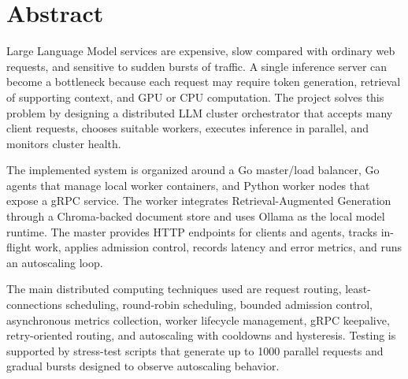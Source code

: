 \section*{Abstract}

Large Language Model services are expensive, slow compared with ordinary web requests, and sensitive to sudden bursts of traffic. A single inference server can become a bottleneck because each request may require token generation, retrieval of supporting context, and GPU or CPU computation. The project solves this problem by designing a distributed LLM cluster orchestrator that accepts many client requests, chooses suitable workers, executes inference in parallel, and monitors cluster health.

The implemented system is organized around a Go master/load balancer, Go agents that manage local worker containers, and Python worker nodes that expose a gRPC service. The worker integrates Retrieval-Augmented Generation through a Chroma-backed document store and uses Ollama as the local model runtime. The master provides HTTP endpoints for clients and agents, tracks in-flight work, applies admission control, records latency and error metrics, and runs an autoscaling loop.

The main distributed computing techniques used are request routing, least-connections scheduling, round-robin scheduling, bounded admission control, asynchronous metrics collection, worker lifecycle management, gRPC keepalive, retry-oriented routing, and autoscaling with cooldowns and hysteresis. Testing is supported by stress-test scripts that generate up to 1000 parallel requests and gradual bursts designed to observe autoscaling behavior.
